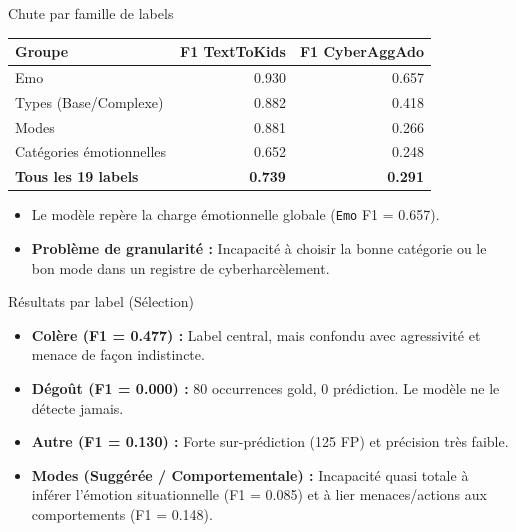 \documentclass{beamer}
\begin{document}
\begin{frame}{Chute par famille de labels}
    \begin{table}[]
        \begin{tabular}{lrr}
        \toprule
        \textbf{Groupe} & \textbf{F1 TextToKids} & \textbf{F1 CyberAggAdo} \\ \midrule
        Emo & 0.930 & 0.657 \\
        Types (Base/Complexe) & 0.882 & 0.418 \\
        Modes & 0.881 & 0.266 \\
        Catégories émotionnelles & 0.652 & 0.248 \\ \midrule
        \textbf{Tous les 19 labels} & \textbf{0.739} & \textbf{0.291} \\ \bottomrule
        \end{tabular}
    \end{table}
    \vspace{0.5cm}
    \begin{itemize}
        \item Le modèle repère la charge émotionnelle globale (\texttt{Emo} F1 = 0.657).
        \item \textbf{Problème de granularité :} Incapacité à choisir la bonne catégorie ou le bon mode dans un registre de cyberharcèlement.
    \end{itemize}
\end{frame}

\begin{frame}{Résultats par label (Sélection)}
    \begin{itemize}
        \item \textbf{Colère (F1 = 0.477) :} Label central, mais confondu avec agressivité et menace de façon indistincte.
        \item \textbf{Dégoût (F1 = 0.000) :} 80 occurrences gold, 0 prédiction. Le modèle ne le détecte jamais.
        \item \textbf{Autre (F1 = 0.130) :} Forte sur-prédiction (125 FP) et précision très faible.
        \item \textbf{Modes (Suggérée / Comportementale) :} Incapacité quasi totale à inférer l'émotion situationnelle (F1 = 0.085) et à lier menaces/actions aux comportements (F1 = 0.148).
    \end{itemize}
\end{frame}
\end{document}
